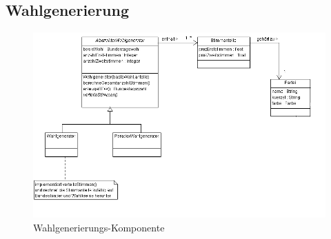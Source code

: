 \documentclass[12pt,a4paper,titlepage]{article}
\begin{document}
\subsection{Wahlgenerierung}
\begin{figure}[!ht]
\includegraphics[scale=0.5]{Wahlgenerator_Klassendiagramm} \caption{Wahlgenerierungs-Komponente} 
\end{figure}
\end{document}
